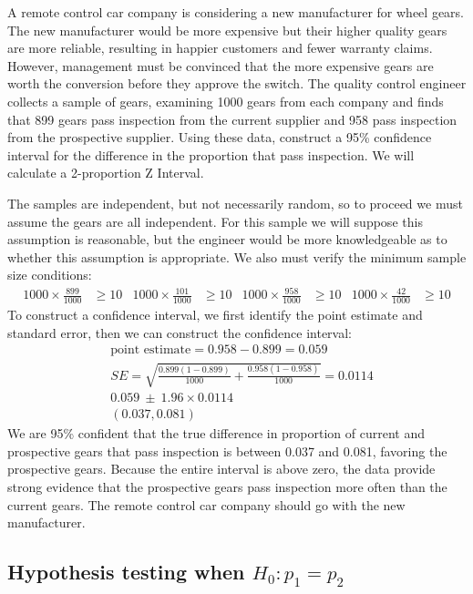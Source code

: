 \begin{example}{A remote control car company is considering a new manufacturer for wheel gears. The new manufacturer would be more expensive but their higher quality gears are more reliable, resulting in happier customers and fewer warranty claims. However, management must be convinced that the more expensive gears are worth the conversion before they approve the switch. The quality control engineer collects a sample of gears, examining 1000 gears from each company and finds that 899 gears pass inspection from the current supplier and 958 pass inspection from the prospective supplier. Using these data, construct a 95\% confidence interval for the difference in the proportion that pass inspection.}
We will calculate a 2-proportion Z Interval.

The samples are independent, but not necessarily random, so to proceed we must assume the gears are all independent. For this sample we will suppose this assumption is reasonable, but the engineer would be more knowledgeable as to whether this assumption is appropriate. We also must verify the minimum sample size conditions:
\begin{align*}
1000 \times \frac{899}{1000} &\ge 10
	&1000 \times \frac{101}{1000} &\ge 10
	&1000 \times \frac{958}{1000} &\ge 10
	&1000 \times \frac{42}{1000} &\ge 10
\end{align*}
To construct a confidence interval, we first identify the point estimate and standard error, then we can construct the confidence interval:
\begin{align*}
&\text{point estimate} = 0.958 - 0.899 = 0.059 \\
&SE = \sqrt{\frac{0.899(1-0.899)}{1000} +
			\frac{0.958(1-0.958)}{1000}}
	= 0.0114 \\
&0.059\ \pm\ 1.96 \times 0.0114 \\
&(0.037, 0.081)
\end{align*}
We are 95\% confident that the true difference in proportion of current and prospective gears that pass inspection is between 0.037 and 0.081, favoring the prospective gears. Because the entire interval is above zero, the data provide strong evidence that the prospective gears pass inspection more often than the current gears. The remote control car company should go with the new manufacturer.
\end{example}


\subsection{Hypothesis testing when $H_0: p_1 = p_2$}
\label{pooledHTForProportionsSection}

